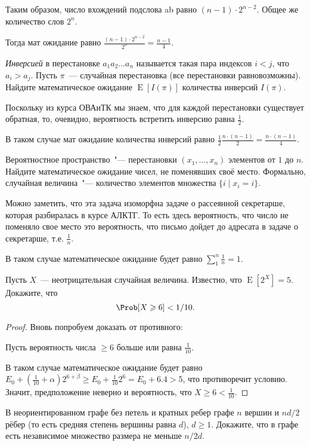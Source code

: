 \documentclass[12pt]{extreport}
\theoremstyle{definiton}
\theoremstyle{definition}
\theoremstyle{definition}
\let\geq\geqslant
\newcounter{problem}
\newcounter{subproblem}
\def\beforPRskip{
	\bigskip
}
\def\pr{\beforPRskip\noindent\stepcounter{problem}{\bf \theproblem .\;}\setcounter{subproblem}{0}}
\newcommand{\Ex}{\mathop{\mathrm{E}}}
\begin{document}
	Таким образом, число вхождений подслова ab равно $(n-1) \cdot 2^{n-2}$. Общее же количество слов $2^n$. 

	Тогда мат ожидание равно $\frac{(n-1) \cdot 2^{n-2}}{2^n} = \frac{n-1}{4}.$

	\pr \emph{Инверсией} в перестановке $a_1a_2\dots a_n$ называется такая пара
	индексов $i<j$, что $a_i>a_j$. Пусть $\pi$~--- случайная перестановка
	(все перестановки равновозможны). Найдите математическое ожидание
	$\Ex[I(\pi)]$ количества инверсий $I(\pi)$.
	
	Поскольку из курса ОВАиТК мы знаем, что для каждой перестановки существует обратная, то, очевидно, вероятность встретить инверсию равна $\frac{1}{2}$.

	В таком случае мат ожидание количества инверсий равно $\frac{1}{2} \frac{n \cdot (n-1)}{2} = \frac{n \cdot (n-1)}{4}$.

	\pr Вероятностное пространство~"--- перестановки $(x_1,\ldots,x_n)$ элементов от $1$ до $n$. Найдите математическое ожидание чисел, не поменявших своё место. Формально, случайная величина~"--- количество элементов множества $\{i \mid x_i = i\}$.
	
	Можно заметить, что эта задача изоморфна задаче о рассеянной секретарше, которая разбиралась в курсе АЛКТГ. То есть здесь вероятность, что число не поменяло свое место это вероятность, что письмо дойдет до адресата в задаче о секретарше, т.е. $\frac{1}{n}$.

	В таком случае математическое ожидание будет равно $\sum_1 ^n \frac{1}{n} = 1$.

	\pr Пусть  $X$~--- неотрицательная случайная величина. Известно, что
	$\Ex[2^X]=5$. Докажите, что $$\Prob[X\geq 6]< 1/10.$$

		\begin{proof}
			Вновь попробуем доказать от противного:

			Пусть вероятность числа $\geq 6$ больше или равна $\frac{1}{10}$.

			В таком случае математическое ожидание будет равно $E_0 + (\frac{1}{10} + \alpha) 2^{6 + \beta} \geq E_0 + \frac{1}{10} 2^6 = E_0 + 6.4 > 5$, что противоречит условию. Значит, предположение неверно и вероятность, что $X \geq 6 < \frac{1}{10}$.
		\end{proof}
	
	\pr В неориентированном графе без петель и кратных ребер графе $n$ вершин и $nd/2$ рёбер (то есть средняя степень вершины
		равна $d$), $d\geq1$. Докажите, что в графе есть независимое множество
		размера не меньше $n/2d$.
		
\end{document}
